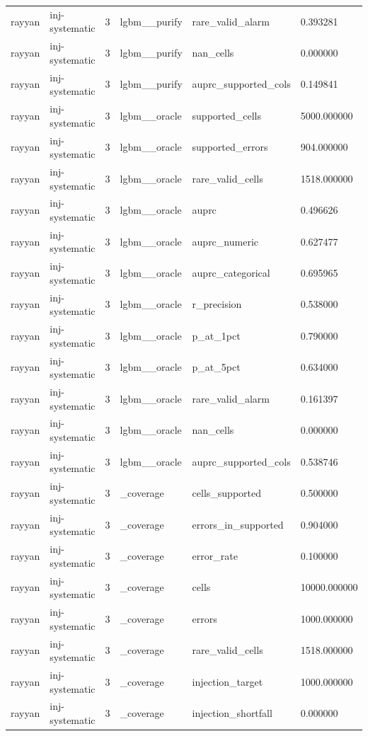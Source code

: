 \begin{tabular}{llllll}
rayyan & inj-systematic & 3 & lgbm\_\_purify & rare\_valid\_alarm & 0.393281 \\
rayyan & inj-systematic & 3 & lgbm\_\_purify & nan\_cells & 0.000000 \\
rayyan & inj-systematic & 3 & lgbm\_\_purify & auprc\_supported\_cols & 0.149841 \\
rayyan & inj-systematic & 3 & lgbm\_\_oracle & supported\_cells & 5000.000000 \\
rayyan & inj-systematic & 3 & lgbm\_\_oracle & supported\_errors & 904.000000 \\
rayyan & inj-systematic & 3 & lgbm\_\_oracle & rare\_valid\_cells & 1518.000000 \\
rayyan & inj-systematic & 3 & lgbm\_\_oracle & auprc & 0.496626 \\
rayyan & inj-systematic & 3 & lgbm\_\_oracle & auprc\_numeric & 0.627477 \\
rayyan & inj-systematic & 3 & lgbm\_\_oracle & auprc\_categorical & 0.695965 \\
rayyan & inj-systematic & 3 & lgbm\_\_oracle & r\_precision & 0.538000 \\
rayyan & inj-systematic & 3 & lgbm\_\_oracle & p\_at\_1pct & 0.790000 \\
rayyan & inj-systematic & 3 & lgbm\_\_oracle & p\_at\_5pct & 0.634000 \\
rayyan & inj-systematic & 3 & lgbm\_\_oracle & rare\_valid\_alarm & 0.161397 \\
rayyan & inj-systematic & 3 & lgbm\_\_oracle & nan\_cells & 0.000000 \\
rayyan & inj-systematic & 3 & lgbm\_\_oracle & auprc\_supported\_cols & 0.538746 \\
rayyan & inj-systematic & 3 & \_coverage & cells\_supported & 0.500000 \\
rayyan & inj-systematic & 3 & \_coverage & errors\_in\_supported & 0.904000 \\
rayyan & inj-systematic & 3 & \_coverage & error\_rate & 0.100000 \\
rayyan & inj-systematic & 3 & \_coverage & cells & 10000.000000 \\
rayyan & inj-systematic & 3 & \_coverage & errors & 1000.000000 \\
rayyan & inj-systematic & 3 & \_coverage & rare\_valid\_cells & 1518.000000 \\
rayyan & inj-systematic & 3 & \_coverage & injection\_target & 1000.000000 \\
rayyan & inj-systematic & 3 & \_coverage & injection\_shortfall & 0.000000 \\

\end{tabular}
